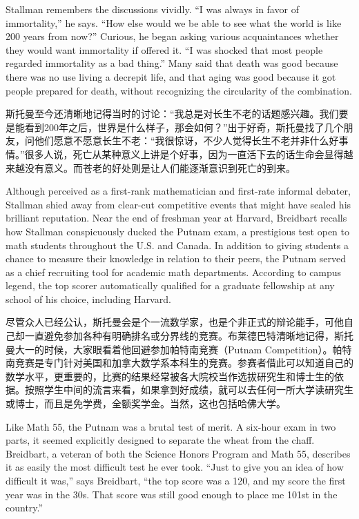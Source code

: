 \ifdefined\eng
Stallman remembers the discussions vividly. ``I was always in favor of immortality,'' he says. ``How else would we be able to see what the world is like 200 years from now?'' Curious, he began asking various acquaintances whether they would want immortality if offered it. ``I was shocked that most people regarded immortality as a bad thing.'' Many said that death was good because there was no use living a decrepit life, and that aging was good because it got people prepared for death, without recognizing the circularity of the combination.
\fi

\ifdefined\chs
斯托曼至今还清晰地记得当时的讨论：``我总是对长生不老的话题感兴趣。我们要是能看到200年之后，世界是什么样子，那会如何？''出于好奇，斯托曼找了几个朋友，问他们愿意不愿意长生不老：``我很惊讶，不少人觉得长生不老并非什么好事情。''很多人说，死亡从某种意义上讲是个好事，因为一直活下去的话生命会显得越来越没有意义。而苍老的好处则是让人们能逐渐意识到死亡的到来。
\fi

\ifdefined\eng
Although perceived as a first-rank mathematician and first-rate informal debater, Stallman shied away from clear-cut competitive events that might have sealed his brilliant reputation. Near the end of freshman year at Harvard, Breidbart recalls how Stallman conspicuously ducked the Putnam exam, a prestigious test open to math students throughout the U.S. and Canada. In addition to giving students a chance to measure their knowledge in relation to their peers, the Putnam served as a chief recruiting tool for academic math departments. According to campus legend, the top scorer automatically qualified for a graduate fellowship at any school of his choice, including Harvard.
\fi

\ifdefined\chs
尽管众人已经公认，斯托曼会是个一流数学家，也是个非正式的辩论能手，可他自己却一直避免参加各种有明确排名或分界线的竞赛。布莱德巴特清晰地记得，斯托曼大一的时候，大家眼看着他回避参加帕特南竞赛（Putnam Competition）。帕特南竞赛是专门针对美国和加拿大数学系本科生的竞赛。参赛者借此可以知道自己的数学水平，更重要的，比赛的结果经常被各大院校当作选拔研究生和博士生的依据。按照学生中间的流言来看，如果拿到好成绩，就可以去任何一所大学读研究生或博士，而且是免学费，全额奖学金。当然，这也包括哈佛大学。
\fi

\ifdefined\eng
Like Math 55, the Putnam was a brutal test of merit. A six-hour exam in two parts, it seemed explicitly designed to separate the wheat from the chaff. Breidbart, a veteran of both the Science Honors Program and Math 55, describes it as easily the most difficult test he ever took. ``Just to give you an idea of how difficult it was,'' says Breidbart, ``the top score was a 120, and my score the first year was in the 30s. That score was still good enough to place me 101st in the country.''
\fi

